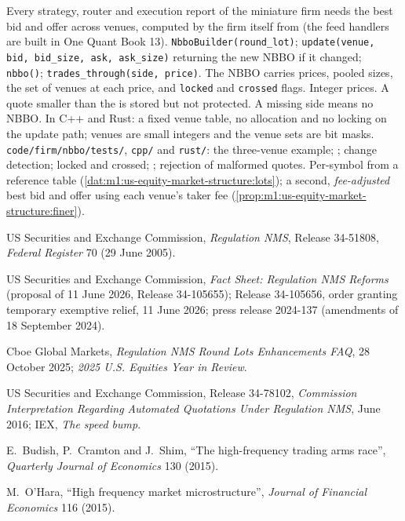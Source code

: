 \begin{build}
 Every strategy, router and execution report of the
miniature firm needs the best bid and offer across venues, computed by the
firm itself from  (the feed handlers are built in One Quant Book
13).
 \texttt{NbboBuilder(round\_lot)};
\texttt{update(venue, bid, bid\_size, ask, ask\_size)} returning the new NBBO
if it changed; \texttt{nbbo()}; \texttt{trades\_through(side, price)}. The
NBBO carries prices, pooled sizes, the set of venues at each price, and
\texttt{locked} and \texttt{crossed} flags.
 Integer prices. A quote smaller than the  is stored
but not protected. A missing side means no NBBO. In C++ and Rust: a fixed
venue table, no allocation and no locking on the update path; venues are
small integers and the venue sets are bit masks.
 \texttt{code/firm/nbbo/tests/}, \texttt{cpp/} and
\texttt{rust/}: the three-venue example; ; change detection; locked
and crossed; ; rejection of malformed quotes.
 Per-symbol  from a reference table
(\cref{dat:m1:us-equity-market-structure:lots}); a second, \emph{fee-adjusted}
best bid and offer using each venue's taker fee
(\cref{prop:m1:us-equity-market-structure:finer}).
\end{build}

\begin{omsources}
\item US Securities and Exchange Commission, \emph{Regulation NMS}, Release
34-51808, \emph{Federal Register} 70 (29 June 2005).
\item US Securities and Exchange Commission, \emph{Fact Sheet: Regulation NMS
Reforms} (proposal of 11 June 2026, Release 34-105655); Release 34-105656,
order granting temporary exemptive relief, 11 June 2026; press release
2024-137 (amendments of 18 September 2024).
\item Cboe Global Markets, \emph{Regulation NMS Round Lots Enhancements FAQ},
28 October 2025; \emph{2025 U.S. Equities Year in Review}.
\item US Securities and Exchange Commission, Release 34-78102,
\emph{Commission Interpretation Regarding Automated Quotations Under
Regulation NMS}, June 2016; IEX, \emph{The speed bump}.
\item E.~Budish, P.~Cramton and J.~Shim, ``The high-frequency trading arms
race'', \emph{Quarterly Journal of Economics} 130 (2015).
\item M.~O'Hara, ``High frequency market microstructure'', \emph{Journal of
Financial Economics} 116 (2015).
\end{omsources}

